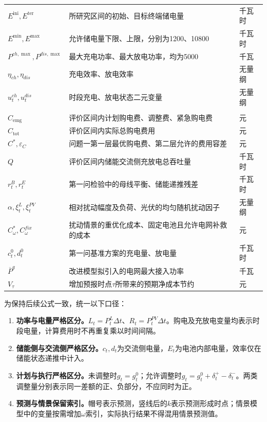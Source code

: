 \documentclass[UTF8,a4paper,12pt,fontset=fandol]{ctexart}
\numberwithin{equation}{section}
\begin{document}
\begin{longtable}{>{\raggedright\arraybackslash}p{}>{\raggedright\arraybackslash}p{}>{\raggedright\arraybackslash}p{}}
$E^{\mathrm{ini}},E^{\mathrm{ter}}$ & 所研究区间的初始、目标终端储电量 & 千瓦时\\
$E^{\min},E^{\max}$ & 允许储电量下限、上限，分别为1200、10800 & 千瓦时\\
$P^{ch,\max},P^{dis,\max}$ & 最大充电功率、最大放电功率，均为5000 & 千瓦\\
$\eta_{ch},\eta_{dis}$ & 充电效率、放电效率 & 无量纲\\
$u_t^{ch},u_t^{dis}$ & 时段充电、放电状态二元变量 & 无量纲\\
\shortstack[l]{$C_{\mathrm{plan}},C_{\mathrm{adj}}$\\$C_{\mathrm{emg}}$} & 评价区间内计划购电费、调整费、紧急购电费 & 元\\
$C_{\mathrm{tot}}$ & 评价区间内实际总购电费用 & 元\\
$C^*,\varepsilon_C$ & 问题一第一层最优购电费、第二层允许的费用容差 & 元\\
$Q$ & 评价区间内储能交流侧充放电总吞吐量 & 千瓦时\\
$r_t^B,r_t^E$ & 第一问检验中的母线平衡、储能递推残差 & 千瓦时\\
$\alpha,\xi_t^L,\xi_t^{PV}$ & 相对扰动幅度及负荷、光伏的均匀随机扰动因子 & 无量纲\\
$C_\omega^*,C_\omega^{fix}$ & 扰动情景的重优化成本、固定电池且允许电网补救的成本 & 元\\
$c_t^0,d_t^0$ & 第一问基准方案的充电量、放电量 & 千瓦时\\
$\overline P^g$ & 改进模型拟引入的电网最大接入功率 & 千瓦\\
$V_\tau$ & 增加预报时点$\tau$所带来的预期净成本节约 & 元\\
\end{longtable}
\endgroup

为保持后续公式一致，统一以下口径：
\begin{enumerate}
\item \textbf{功率与电量严格区分。}$L_t=P_t^L\Delta t$、$R_t=P_t^{PV}\Delta t$。购电及充放电变量均表示时段电量，计算费用时不再重复乘以时间间隔。
\item \textbf{储能侧与交流侧严格区分。}$c_t,d_t$为交流侧电量，$E_t$为电池内部电量，效率仅在储能状态递推中计入。
\item \textbf{计划与执行严格区分。}未调整时$g_t=g_t^0$；允许调整时$g_t=g_t^0+\delta_t^+-\delta_t^-$。两类调整量分别表示同一差额的正、负部分，不应同时为正。
\item \textbf{预测与情景保留索引。}帽号表示预测，竖线后的$k$表示预测形成时点；情景模型中的变量按需增加$\omega$索引，实际执行结果不得混用情景预测值。
\end{enumerate}
\end{document}

